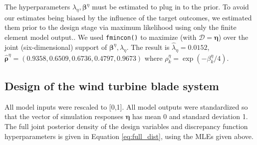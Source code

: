\documentclass[12pt]{article}
\begin{document}
The hyperparameters $\lambda_\eta,\boldsymbol \beta^\eta$ must be estimated to plug in to the prior.
% 
To avoid our estimates being biased by the influence of the target outcomes, we estimated them prior to the design stage via maximum likelihood using only the finite element model output..
% 
%
We used \texttt{fmincon()} \citep{MATLAB2017} %
to maximize (with $\mathcal D=\boldsymbol\eta$) over the joint (six-dimensional) support of $\boldsymbol \beta^\eta,\lambda_\eta$.  
%
The result is $\hat\lambda_\eta = 0.0152$, $\boldsymbol {\hat\rho}^\eta = (0.9358, 0.6509, 0.6736, 0.4797, 0.9673)$
where $\rho^\eta_k = \exp(-\beta_k^\eta/4)$. 

\subsection{Design of the wind turbine blade system}\label{the_model}
%
All model inputs were rescaled to [0,1]. 
%
All model outputs were standardized so that the vector of simulation responses $\boldsymbol\eta$ has mean 0 and standard deviation 1.
%
The full joint posterior density of the design variables and discrepancy function hyperparameters is given in Equation \eqref{eq:full_dist}, using the MLEs given above.
%
\end{document}

